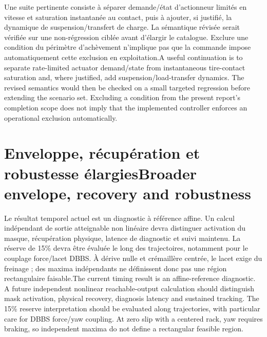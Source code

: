 \documentclass[11pt,a4paper,oneside]{report}
\newcommand{\bi}[2]{\iffrench #2\else #1\fi}
\renewcommand{\sec}[2]{\section{\bi{#1}{#2}}}
\begin{document}
\bi{A useful continuation is to separate rate-limited actuator demand/state from instantaneous tire-contact saturation and, where justified, add suspension/load-transfer dynamics. The revised semantics would then be checked on a small targeted regression before extending the scenario set. Excluding a condition from the present report's completion scope does not imply that the implemented controller enforces an operational exclusion automatically.}{Une suite pertinente consiste à séparer demande/état d'actionneur limités en vitesse et saturation instantanée au contact, puis à ajouter, si justifié, la dynamique de suspension/transfert de charge. La sémantique révisée serait vérifiée sur une non-régression ciblée avant d'élargir le catalogue. Exclure une condition du périmètre d'achèvement n'implique pas que la commande impose automatiquement cette exclusion en exploitation.}
\sec{Broader envelope, recovery and robustness}{Enveloppe, récupération et robustesse élargies}
\bi{The current timing result is an affine-reference diagnostic. A future independent nonlinear reachable-output calculation should distinguish mask activation, physical recovery, diagnosis latency and sustained tracking. The 15\% reserve interpretation should be evaluated along trajectories, with particular care for DBBS force/yaw coupling. At zero slip with a centered rack, yaw requires braking, so independent maxima do not define a rectangular feasible region.}{Le résultat temporel actuel est un diagnostic à référence affine. Un calcul indépendant de sortie atteignable non linéaire devra distinguer activation du masque, récupération physique, latence de diagnostic et suivi maintenu. La réserve de 15\% devra être évaluée le long des trajectoires, notamment pour le couplage force/lacet DBBS. À dérive nulle et crémaillère centrée, le lacet exige du freinage ; des maxima indépendants ne définissent donc pas une région rectangulaire faisable.}
\end{document}

